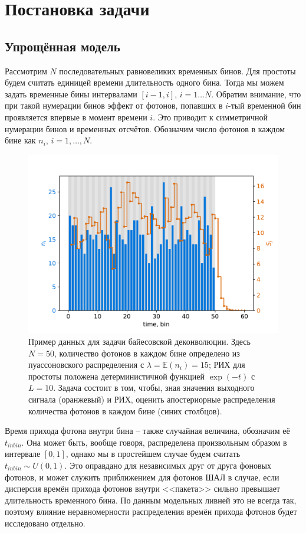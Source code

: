 \documentclass[12pt]{article}
\begin{document}
	\section{Постановка задачи}
	
	\subsection{Упрощённая модель}
	
	Рассмотрим $N$ последовательных равновеликих временных бинов. Для простоты будем считать единицей времени длительность одного бина. Тогда мы можем задать временные бины интервалами $[i-1, i]$, $i = 1 \ldots N$. Обратим внимание, что при такой нумерации бинов эффект от фотонов, попавших в $i$-тый временной бин проявляется впервые в момент времени $i$. Это приводит к симметричной нумерации бинов и временных отсчётов. Обозначим число фотонов в каждом бине как $n_i$, $i = 1, \ldots, N$.

	\begin{figure}[t!]
		\centering
		\includegraphics[width=\columnwidth]{problem-setup-example}
		\caption{Пример данных для задачи байесовской деконволюции. Здесь $N = 50$, количество фотонов в каждом бине определено из пуассоновского распределения с $\lambda = \mathbb{E}(n_i) = 15$; РИХ для простоты положена детерминистичной функцией $\exp(-t)$ с $L = 10$. Задача состоит в том, чтобы, зная значения выходного сигнала (оранжевый) и РИХ, оценить апостериорные распределения количества фотонов в каждом бине (синих столбцов).}
		\label{pic:problem-setup}
	\end{figure}

	Время прихода фотона внутри бина -- также случайная величина, обозначим её $t_{inbin}$. Она может быть, вообще говоря, распределена произвольным образом в интервале $[ 0, 1 ]$, однако мы в простейшем случае будем считать $t_{inbin} \sim U(0, 1)$. Это оправдано для независимых друг от друга фоновых фотонов, и может служить приближением для фотонов ШАЛ в случае, если дисперсия времён прихода фотонов внутри <<пакета>> сильно превышает длительность временного бина. По данным модельных ливней это не всегда так, поэтому влияние неравномерности распределения времён прихода фотонов будет исследовано отдельно.
\end{document}
